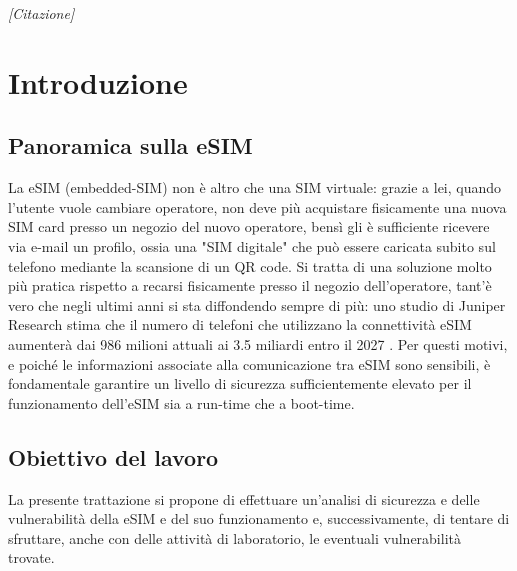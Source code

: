 \documentclass[10pt, twoside, openany]{book}
\begin{document}
\begin{frontespizio}
\end{frontespizio}

\begin{flushright}
\null{}
\textit{[Citazione]}
\null
\end{flushright}

\tableofcontents
\listoffigures
\listoftables

\chapter{Introduzione}
\section{Panoramica sulla eSIM}
La eSIM (embedded-SIM) non è altro che una SIM virtuale: grazie a lei, quando l'utente vuole cambiare operatore, non deve più acquistare fisicamente una nuova SIM card presso un negozio del nuovo operatore, bensì gli è sufficiente ricevere via e-mail un profilo, ossia una "SIM digitale" che può essere caricata subito sul telefono mediante la scansione di un QR code. Si tratta di una soluzione molto più pratica rispetto a recarsi fisicamente presso il negozio dell'operatore, tant'è vero che negli ultimi anni si sta diffondendo sempre di più: uno studio di Juniper Research stima che il numero di telefoni che utilizzano la connettività eSIM aumenterà dai 986 milioni attuali ai 3.5 miliardi entro il 2027 \cite{Corcom}. Per questi motivi, e poiché le informazioni associate alla comunicazione tra eSIM sono sensibili, è fondamentale garantire un livello di sicurezza sufficientemente elevato per il funzionamento dell'eSIM sia a run-time che a boot-time.

\section{Obiettivo del lavoro}
La presente trattazione si propone di effettuare un'analisi di sicurezza e delle vulnerabilità della eSIM e del suo funzionamento e, successivamente, di tentare di sfruttare, anche con delle attività di laboratorio, le eventuali vulnerabilità trovate.
\end{document}

